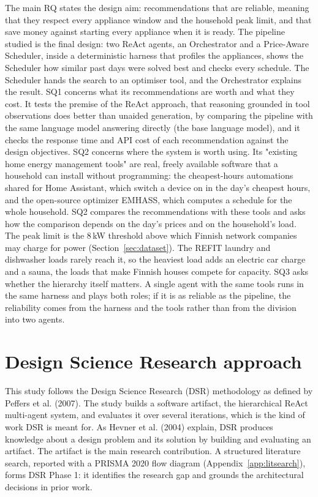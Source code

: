 \documentclass[12pt,a4paper]{report}
\begin{document}
The main RQ states the design aim: recommendations that are reliable,
meaning that they respect every appliance window and the household peak
limit, and that save money against starting every appliance when it is
ready. The pipeline studied is the final design: two ReAct agents, an
Orchestrator and a Price-Aware Scheduler, inside a deterministic harness
that profiles the appliances, shows the Scheduler how similar past days
were solved best and checks every schedule. The Scheduler hands the
search to an optimiser tool, and the Orchestrator explains the result.
SQ1 concerns what its recommendations are worth and what they cost. It
tests the premise of the ReAct approach, that reasoning grounded in tool
observations does better than unaided generation, by comparing the
pipeline with the same language model answering directly (the base
language model), and it checks
the response time and API cost of each recommendation against the
design objectives. SQ2 concerns where the system is worth using. Its
"existing home energy management tools" are real, freely available
software that a household can install without programming: the
cheapest-hours automations shared for Home Assistant, which switch a device on in the day's cheapest hours, and the
open-source optimizer EMHASS, which computes a schedule for the whole
household. SQ2 compares the recommendations with these tools and asks
how the comparison depends on the day's prices and on the household's
load. The peak limit is the 8\,kW threshold above which Finnish network
companies may charge for power (Section~\ref{sec:dataset}). The REFIT
laundry and dishwasher loads rarely reach it, so the heaviest load adds
an electric car charge and a sauna, the loads that make Finnish houses
compete for capacity. SQ3 asks whether the hierarchy itself matters. A
single agent with the same tools runs in the same harness and plays both
roles; if it is as reliable as the pipeline, the reliability comes from
the harness and the tools rather than from the division into two agents.

\section{Design Science Research approach}

This study follows the Design Science Research (DSR) methodology as
defined by Peffers et al. (2007). The study builds a software artifact,
the hierarchical ReAct multi-agent system, and evaluates it over several
iterations, which is the kind of work DSR is meant for. As Hevner et al.
(2004) explain, DSR produces knowledge about a design problem and its
solution by building and evaluating an artifact. The artifact is the
main research contribution. A structured literature search, reported
with a PRISMA 2020 flow diagram (Appendix~\ref{app:litsearch}), forms DSR
Phase 1: it identifies the research gap and grounds the architectural
decisions in prior work.
\end{document}
